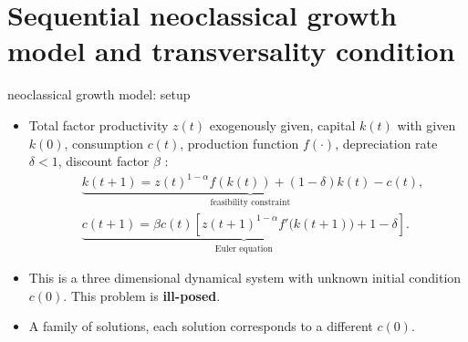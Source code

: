 \documentclass[aspectratio=169,10pt]{beamer}
\newcommand{\emphcolor}[1]{\textbf{\textcolor{emphcolorval}{#1}}}
\begin{document}
\section{\textcolor{PennBlue}{Sequential neoclassical growth model and transversality condition}}


\begin{frame}{neoclassical growth model: setup }
	\begin{itemize}
		\item Total factor productivity $z(t)$ exogenously given, capital $k(t)$ with given $k(0)$, consumption $c(t)$, production function $f(\cdot)$, depreciation rate $\delta<1$, discount factor $\beta$  :
		\begin{align*}
			&\underbrace{k(t+1) = z(t)^{1-\alpha} f\left(k(t)\right)+ (1-\delta)k(t)-c(t)}_{\text{feasibility constraint}}, \\ 
			&\underbrace{c(t+1) = \beta c(t) \left[z(t+1)^{1-\alpha}f'\big(k(t+1)\big)+1-\delta\right]}_{\text{Euler equation}}.
		\end{align*}
	\item This is a three dimensional dynamical system with unknown initial condition  $c(0)$. This problem is \emphcolor{ill-posed}.
	\vspace{0.05in}
	\item A family of solutions, each solution corresponds to a different $c(0)$.
	\end{itemize}	
\end{frame}
\end{document}
